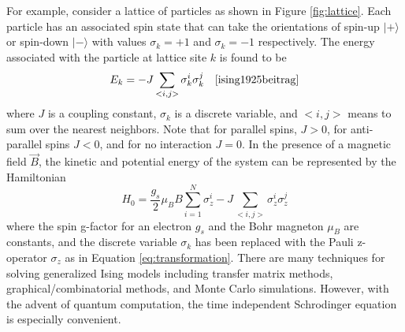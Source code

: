 For example, consider a lattice of particles as shown in Figure \ref{fig:lattice}. 
Each particle has an associated spin state that can take the orientations of spin-up $|+\rangle$ or spin-down $|-\rangle$ with values $\sigma_k = +1$ and $\sigma_k = -1$ respectively. The energy associated with the particle at lattice site $k$ is found to be 
\begin{equation}
	E_k= - J\sum_{<i,j>}\sigma_k^i\sigma_k^j \quad \cite{ising1925beitrag}
	\label{eq:latticeSiteEnergy}
\end{equation}
where $J$ is a coupling constant, $\sigma_k$ is a discrete variable, and $<i,j>$ means to sum over the nearest neighbors. Note that for parallel spins, $J>0$, for anti-parallel spins $J<0$, and for no interaction $J = 0$. 
In the presence of a magnetic field $\vec{B}$, the kinetic and potential energy of the system can be represented by the Hamiltonian
\begin{equation}
	H_0 = \frac{g_s}{2}\mu_B B\sum_{i=1}^N \sigma_z^i - J\sum_{<i,j>}\sigma_z^i\sigma_z^j
	\label{eq:isingHamiltonian}
\end{equation} 
where the spin g-factor for an electron $g_s$ and the Bohr magneton $\mu_B$ are constants, and the discrete variable $\sigma_k$ has been replaced with the Pauli z-operator $\sigma_z$ as in Equation \ref{eq:transformation}. 
There are many techniques for solving generalized Ising models including transfer matrix methods\cite{onsager1944crystal}, graphical/combinatorial methods\cite{feynman1972statistical}, and Monte Carlo simulations\cite{schroeder2011thermal}. 
However, with the advent of quantum computation, the time independent Schrodinger equation is especially convenient.
